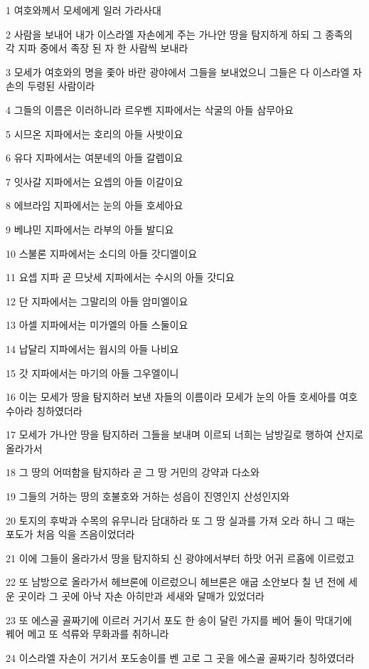 \par 1 여호와께서 모세에게 일러 가라사대
\par 2 사람을 보내어 내가 이스라엘 자손에게 주는 가나안 땅을 탐지하게 하되 그 종족의 각 지파 중에서 족장 된 자 한 사람씩 보내라
\par 3 모세가 여호와의 명을 좇아 바란 광야에서 그들을 보내었으니 그들은 다 이스라엘 자손의 두령된 사람이라
\par 4 그들의 이름은 이러하니라 르우벤 지파에서는 삭굴의 아들 삼무아요
\par 5 시므온 지파에서는 호리의 아들 사밧이요
\par 6 유다 지파에서는 여분네의 아들 갈렙이요
\par 7 잇사갈 지파에서는 요셉의 아들 이갈이요
\par 8 에브라임 지파에서는 눈의 아들 호세아요
\par 9 베냐민 지파에서는 라부의 아들 발디요
\par 10 스불론 지파에서는 소디의 아들 갓디엘이요
\par 11 요셉 지파 곧 므낫세 지파에서는 수시의 아들 갓디요
\par 12 단 지파에서는 그말리의 아들 암미엘이요
\par 13 아셀 지파에서는 미가엘의 아들 스둘이요
\par 14 납달리 지파에서는 웝시의 아들 나비요
\par 15 갓 지파에서는 마기의 아들 그우엘이니
\par 16 이는 모세가 땅을 탐지하러 보낸 자들의 이름이라 모세가 눈의 아들 호세아를 여호수아라 칭하였더라
\par 17 모세가 가나안 땅을 탐지하러 그들을 보내며 이르되 너희는 남방길로 행하여 산지로 올라가서
\par 18 그 땅의 어떠함을 탐지하라 곧 그 땅 거민의 강약과 다소와
\par 19 그들의 거하는 땅의 호불호와 거하는 성읍이 진영인지 산성인지와
\par 20 토지의 후박과 수목의 유무니라 담대하라 또 그 땅 실과를 가져 오라 하니 그 때는 포도가 처음 익을 즈음이었더라
\par 21 이에 그들이 올라가서 땅을 탐지하되 신 광야에서부터 하맛 어귀 르홉에 이르렀고
\par 22 또 남방으로 올라가서 헤브론에 이르렀으니 헤브론은 애굽 소안보다 칠 년 전에 세운 곳이라 그 곳에 아낙 자손 아히만과 세새와 달매가 있었더라
\par 23 또 에스골 골짜기에 이르러 거기서 포도 한 송이 달린 가지를 베어 둘이 막대기에 꿰어 메고 또 석류와 무화과를 취하니라
\par 24 이스라엘 자손이 거기서 포도송이를 벤 고로 그 곳을 에스골 골짜기라 칭하였더라
